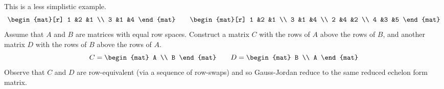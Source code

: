 \begin{exercises}
\begin{answer}
\begin{exparts}
          This is a less simplistic example.
          \begin{equation*}
            \begin{mat}[r]
              1  &2  &1  \\
              3  &1  &4
            \end{mat}
            \qquad
            \begin{mat}[r]
              1  &2  &1  \\
              3  &1  &4  \\
              2  &4  &2  \\
              4  &3  &5
            \end{mat}
          \end{equation*}
        \partsitem Assume that \( A \) and \( B \) are matrices with equal
          row spaces.
          Construct a matrix \( C \) with the rows of \( A \) above the rows
          of \( B \), and another matrix \( D \) with the rows of \( B \)
          above the rows of \( A \).
          \begin{equation*}
            C=\begin{mat}
                 A \\ B
              \end{mat}
            \qquad
            D=\begin{mat}
                 B \\ A
              \end{mat}
          \end{equation*}
          Observe that \( C \) and \( D \) are row-equivalent (via a sequence
          of row-swaps) and so Gauss-Jordan reduce to the same reduced
          echelon form matrix.


\end{exparts}
\end{answer}
\end{exercises}
